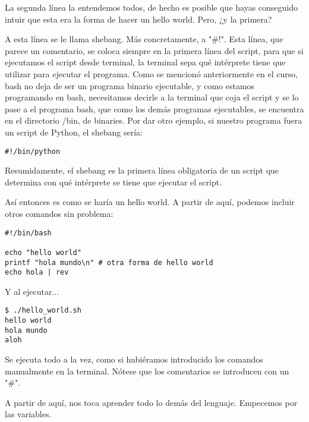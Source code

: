 La segunda línea la entendemos todos, de hecho es posible que hayas conseguido intuir que esta era la forma de hacer un hello world. Pero, ¿y la primera?

A esta línea se le llama shebang. Más concretamente, a "\#!". Esta línea, que parece un comentario, se coloca siempre en la primera línea del script, para que si ejecutamos el script desde terminal, la terminal sepa qué intérprete tiene que utilizar para ejecutar el programa. Como se mencionó anteriormente en el curso, bash no deja de ser un programa binario ejecutable, y como estamos programando en bash, necesitamos decirle a la terminal que coja el script y se lo pase a el programa bash, que como los demás programas ejecutables, se encuentra en el directorio /bin, de binaries. Por dar otro ejemplo, si nuestro programa fuera un script de Python, el shebang sería:

\begin{tcolorbox-code}
\begin{lstlisting}
#!/bin/python
\end{lstlisting}
\end{tcolorbox-code}

Resumidamente, el shebang es la primera línea obligatoria de un script que determina con qué intérprete se tiene que ejecutar el script.

Así entonces es como se haría un hello world. A partir de aquí, podemos incluir otros comandos sin problema:

\begin{tcolorbox-code}
\begin{lstlisting}
#!/bin/bash
    
echo "hello world"
printf "hola mundo\n" # otra forma de hello world
echo hola | rev
\end{lstlisting}
\end{tcolorbox-code}

Y al ejecutar...

\begin{tcolorbox-code}
\begin{lstlisting}
$ ./hello_world.sh
hello world
hola mundo
aloh
\end{lstlisting}
\end{tcolorbox-code}

Se ejecuta todo a la vez, como si hubiéramos introducido los comandos manualmente en la terminal. Nótese que los comentarios se introducen con un "\#".

A partir de aquí, nos toca aprender todo lo demás del lenguaje. Empecemos por las variables.

